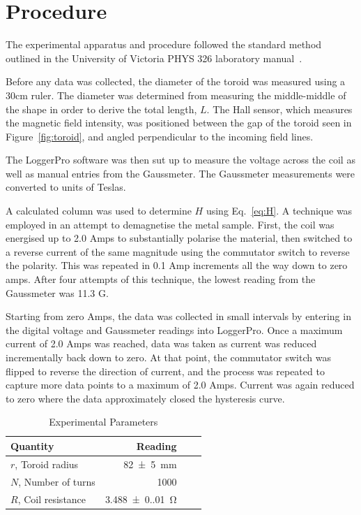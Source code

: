 \section{Procedure}\label{sec:procedure}




The experimental apparatus and procedure followed the standard method outlined in the University of Victoria PHYS 326
laboratory manual~\cite{phys326}.

Before any data was collected, the diameter of the toroid was measured using a 30cm ruler.
The diameter was determined from measuring the middle-middle of the shape in order to derive the total length, $L$.
The Hall sensor, which measures the magnetic field intensity, was positioned between the gap of the toroid seen in
Figure~\ref{fig:toroid}, and angled perpendicular to the incoming field lines.

The LoggerPro software was then sut up to measure the voltage across the coil as well as manual entries from the
Gaussmeter.
The Gaussmeter measurements were converted to units of Teslas.

A calculated column was used to determine $H$ using Eq.~\eqref{eq:H}.
A technique was employed in an attempt to demagnetise the metal sample.
First, the coil was energised up to 2.0 Amps to substantially polarise the material, then switched to a reverse
current of the same magnitude using the commutator switch to reverse the polarity.
This was repeated in 0.1 Amp increments all the way down to zero amps.
After four attempts of this technique, the lowest reading from the Gaussmeter was 11.3 G.

Starting from zero Amps, the data was collected in small intervals by entering in the digital voltage and Gaussmeter
readings into LoggerPro.
Once a maximum current of 2.0 Amps was reached, data was taken as current was reduced incrementally back down to zero.
At that point, the commutator switch was flipped to reverse the direction of current, and the process was repeated
to capture more data points to a maximum of 2.0 Amps.
Current was again reduced to zero where the data approximately closed the hysteresis curve.

\begin{table}[htbp]
    \caption{Experimental Parameters}
    \begin{tabular}{lrrr}
        \toprule
        {Quantity}           & {Reading}                \\
        \midrule
        $r$, Toroid radius   & \qty{82(5)}{\milli\meter} \\
        $N$, Number of turns & 1000                     \\
        $R$, Coil resistance & \qty{3.488(0.010)}{\ohm} \\
        \bottomrule
    \end{tabular}\label{tab:params}
\end{table}

